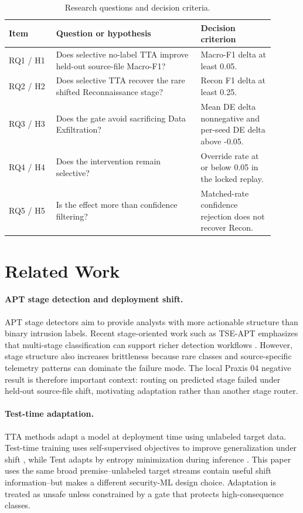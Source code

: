 \documentclass[10pt]{article}
\begin{document}
\begin{table}[tbp]
  \centering
  \caption{Research questions and decision criteria.}
  \label{tab:rq}
  \small
  \setlength{\tabcolsep}{4pt}
  \begin{tabular}{p{0.16\linewidth}p{0.49\linewidth}p{0.25\linewidth}}
    \toprule
    Item & Question or hypothesis & Decision criterion \\
    \midrule
    RQ1 / H1 & Does selective no-label TTA improve held-out source-file Macro-F1? & Macro-F1 delta at least 0.05. \\
    RQ2 / H2 & Does selective TTA recover the rare shifted Reconnaissance stage? & Recon F1 delta at least 0.25. \\
    RQ3 / H3 & Does the gate avoid sacrificing Data Exfiltration? & Mean DE delta nonnegative and per-seed DE delta above -0.05. \\
    RQ4 / H4 & Does the intervention remain selective? & Override rate at or below 0.05 in the locked replay. \\
    RQ5 / H5 & Is the effect more than confidence filtering? & Matched-rate confidence rejection does not recover Recon. \\
    \bottomrule
  \end{tabular}
\end{table}

\section{Related Work}

\paragraph{APT stage detection and deployment shift.}
APT stage detectors aim to provide analysts with more actionable structure than binary intrusion labels.
Recent stage-oriented work such as TSE-APT emphasizes that multi-stage classification can support richer detection workflows \cite{cheng2025tseapt}.
However, stage structure also increases brittleness because rare classes and source-specific telemetry patterns can dominate the failure mode.
The local Praxis 04 negative result is therefore important context: routing on predicted stage failed under held-out source-file shift, motivating adaptation rather than another stage router.

\paragraph{Test-time adaptation.}
TTA methods adapt a model at deployment time using unlabeled target data.
Test-time training uses self-supervised objectives to improve generalization under shift \cite{sun2020testtime}, while Tent adapts by entropy minimization during inference \cite{wang2021tent}.
This paper uses the same broad premise--unlabeled target streams contain useful shift information--but makes a different security-ML design choice.
Adaptation is treated as unsafe unless constrained by a gate that protects high-consequence classes.
\end{document}
